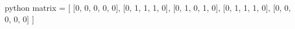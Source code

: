 python
matrix = [
    [0, 0, 0, 0, 0],
    [0, 1, 1, 1, 0],
    [0, 1, 0, 1, 0],
    [0, 1, 1, 1, 0],
    [0, 0, 0, 0, 0]
]
